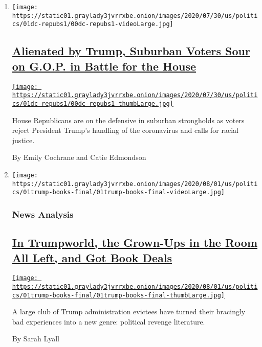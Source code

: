 \begin{enumerate}
\def\labelenumi{\arabic{enumi}.}
\item
  \texttt{[image: https://static01.graylady3jvrrxbe.onion/images/2020/07/30/us/politics/01dc-repubs1/00dc-repubs1-videoLarge.jpg]}

  \hypertarget{alienated-by-trump-suburban-voters-sour-on-gop-in-battle-for-the-house}{%
  \subsection{\texorpdfstring{\href{/2020/08/01/us/politics/trump-suburban-voters-republicans-house.html}{Alienated
  by Trump, Suburban Voters Sour on G.O.P. in Battle for the
  House}}{Alienated by Trump, Suburban Voters Sour on G.O.P. in Battle for the House}}\label{alienated-by-trump-suburban-voters-sour-on-gop-in-battle-for-the-house}}

  \href{/2020/08/01/us/politics/trump-suburban-voters-republicans-house.html}{\texttt{[image: https://static01.graylady3jvrrxbe.onion/images/2020/07/30/us/politics/01dc-repubs1/00dc-repubs1-thumbLarge.jpg]}}

  House Republicans are on the defensive in suburban strongholds as
  voters reject President Trump's handling of the coronavirus and calls
  for racial justice.

  By Emily Cochrane and Catie Edmondson
\item
  \texttt{[image: https://static01.graylady3jvrrxbe.onion/images/2020/08/01/us/politics/01trump-books-final/01trump-books-final-videoLarge.jpg]}

  \hypertarget{news-analysis}{%
  \subsubsection{News Analysis}\label{news-analysis}}

  \hypertarget{in-trumpworld-the-grown-ups-in-the-room-all-left-and-got-book-deals}{%
  \subsection{\texorpdfstring{\href{/2020/08/01/us/politics/trump-books.html}{In
  Trumpworld, the Grown-Ups in the Room All Left, and Got Book
  Deals}}{In Trumpworld, the Grown-Ups in the Room All Left, and Got Book Deals}}\label{in-trumpworld-the-grown-ups-in-the-room-all-left-and-got-book-deals}}

  \href{/2020/08/01/us/politics/trump-books.html}{\texttt{[image: https://static01.graylady3jvrrxbe.onion/images/2020/08/01/us/politics/01trump-books-final/01trump-books-final-thumbLarge.jpg]}}

  A large club of Trump administration evictees have turned their
  bracingly bad experiences into a new genre: political revenge
  literature.

  By Sarah Lyall
\end{enumerate}

